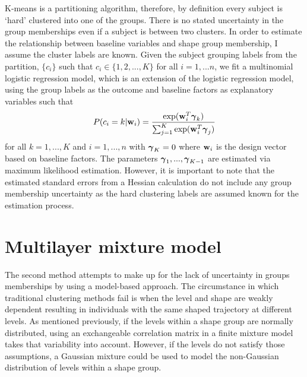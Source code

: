 K-means is a partitioning algorithm, therefore, by definition every subject is `hard' clustered into one of the groups. There is no stated uncertainty in the group memberships even if a subject is between two clusters. In order to estimate the relationship between baseline variables and shape group membership, I assume the cluster labels are known. Given the subject grouping labels from the partition, $\{c_{i}\}$ such that $c_{i}\in\{1,2,...,K\}$ for all $i=1,...n$, we fit a multinomial logistic regression model, which is an extension of the logistic regression model, using the group labels as the outcome and baseline factors as explanatory variables such that
$$P(c_{i} = k|\mathbf w_{i}) = \frac{\exp(\mathbf w_{i}^{T}\boldsymbol\gamma_{k})}{\sum_{j=1}^{K}\exp(\mathbf w_{i}^{T}\boldsymbol\gamma_{j})}$$
for all $k=1,...,K$ and $i=1,...,n$ with $\boldsymbol\gamma_{K}=0$ where $\mathbf w_{i}$ is the design vector based on baseline factors. The parameters $\boldsymbol\gamma_{1},...,\boldsymbol\gamma_{K-1}$ are estimated via maximum likelihood estimation. However, it is important to note that the estimated standard errors from a Hessian calculation do not include any group membership uncertainty  as the hard clustering labels are assumed known for the estimation process.


\section{Multilayer mixture model}\label{sec:multi}
The second method attempts to make up for the lack of uncertainty in groups memberships by using a model-based approach. The circumstance in which traditional clustering methods fail is when the level and shape are weakly dependent resulting in individuals with the same shaped trajectory at different levels. As mentioned previously, if the levels within a shape group are normally distributed, using an exchangeable correlation matrix in a finite mixture model takes that variability into account. However, if the levels do not satisfy those assumptions, a Gaussian mixture could be used to model the non-Gaussian distribution of levels within a shape group. 

